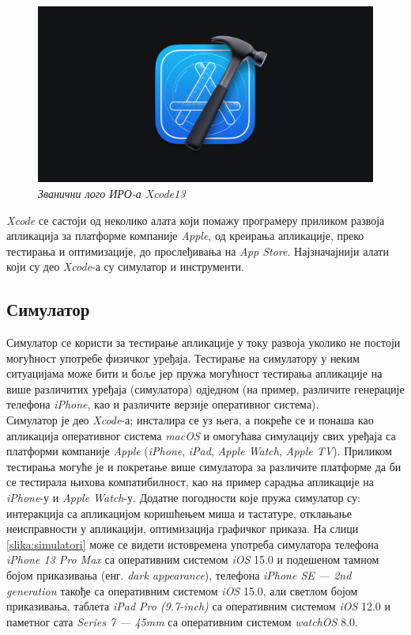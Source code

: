 \documentclass[12pt,oneside]{memoir}
\begin{document}
\begin{figure}[H]
\includegraphics[width=1\textwidth]{images/Xcode_logo.jpg}
\centering
\caption{\textit{Званични лого ИРО-а Xcode13}}
\label{slika:xcode13_logo}
\end{figure}

\indent \textit{Xcode} се састоји од неколико алата који помажу програмеру приликом развоја апликација за платформе компаније \textit{Apple}, од креирања апликације, преко тестирања и оптимизације, до прослеђивања на \textit{App Store}. Најзначајнији алати који су део \textit{Xcode}-а су симулатор и инструменти.

\subsection{Симулатор}
\indent Симулатор се користи за тестирање апликације у току развоја уколико не постоји могућност употребе физичког уређаја. Тестирање на симулатору у неким ситуацијама може бити и боље јер пружа могућност тестирања апликације на више различитих уређаја (симулатора) одједном (на пример, различите генерације телефона \textit{iPhone}, као и различите верзије оперативног система). 
\\
\indent Симулатор је део \textit{Xcode}-а; инсталира се уз њега, а покреће се и понаша као апликација оперативног система \textit{macOS} и омогућава симулацију свих уређаја са платформи компаније \textit{Apple} (\textit{iPhone}, \textit{iPad}, \textit{Apple Watch}, \textit{Apple TV}). Приликом тестирања могуће је и покретање више симулатора за различите платформе да би се тестирала њихова компатибилност, као на пример сарадња апликације на \textit{iPhone}-у и \textit{Apple Watch}-у. 
Додатне погодности које пружа симулатор су: интеракција са апликацијом коришћењем миша и тастатуре, отклањање неисправности у апликацији, оптимизација графичког приказа. На слици \ref{slika:simulatori} може се видети истовремена употреба симулатора телефона \textit{iPhone 13 Pro Max} са оперативним системом \textit{iOS} 15.0 и подешеном тамном бојом приказивања (енг. \textit{dark appearance}), телефона \textit{iPhone SE --- 2nd generation} такође са оперативним системом \textit{iOS} 15.0, али светлом бојом приказивања, таблета \textit{iPad Pro (9.7-inch)} са оперативним системом \textit{iOS} 12.0 и паметног сата \textit{Series 7 --- 45mm} са оперативним системом \textit{watchOS} 8.0.
\end{document}
